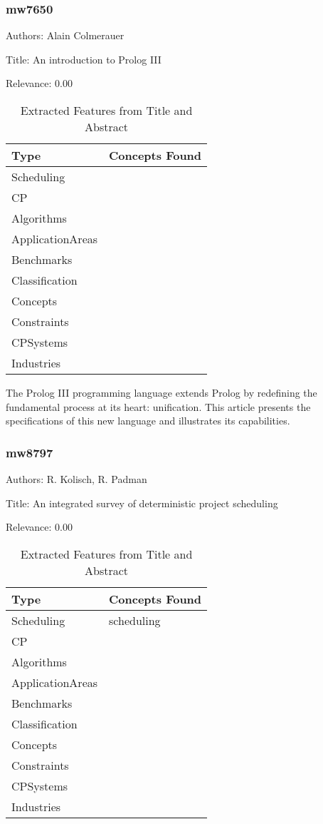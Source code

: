 \subsubsection{mw7650}
\label{mw:mw7650}

Authors: Alain Colmerauer

Title: An introduction to Prolog III

Relevance:  0.00

{\scriptsize
\begin{longtable}{p{2cm}p{20cm}}
\caption{Extracted Features from Title and Abstract}\\ \toprule
Type & Concepts Found\\ \midrule
\endhead
\bottomrule
\endfoot
Scheduling & \\ 
CP & \\ 
Algorithms & \\ 
ApplicationAreas & \\ 
Benchmarks & \\ 
Classification & \\ 
Concepts & \\ 
Constraints & \\ 
CPSystems & \\ 
Industries & \\ 
\end{longtable}
}

 The Prolog III programming language extends Prolog by redefining the fundamental process at its heart: unification. This article presents the specifications of this new language and illustrates its capabilities. 

\subsubsection{mw8797}
\label{mw:mw8797}

Authors: R. Kolisch, R. Padman

Title: An integrated survey of deterministic project scheduling

Relevance:  0.00

{\scriptsize
\begin{longtable}{p{2cm}p{20cm}}
\caption{Extracted Features from Title and Abstract}\\ \toprule
Type & Concepts Found\\ \midrule
\endhead
\bottomrule
\endfoot
Scheduling & scheduling\\ 
CP & \\ 
Algorithms & \\ 
ApplicationAreas & \\ 
Benchmarks & \\ 
Classification & \\ 
Concepts & \\ 
Constraints & \\ 
CPSystems & \\ 
Industries & \\ 
\end{longtable}
}



